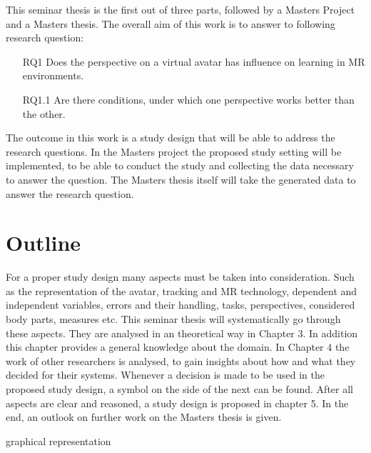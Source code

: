 This seminar thesis is the first out of three parts, followed by a Masters Project and a Masters thesis. The overall aim of this work is to answer to following research question:
\begin{itemize}
	\item[RQ1] Does the perspective on a virtual avatar has influence on learning in MR environments.
	\item[RQ1.1] Are there conditions, under which one perspective works better than the other.
\end{itemize}
The outcome in this work is a study design that will be able to address the research questions. In the Masters project the proposed study setting will be implemented, to be able to conduct the study and collecting the data necessary to answer the question. The Masters thesis itself will take the generated data to answer the research question.


\section{Outline}
For a proper study design many aspects must be taken into consideration. Such as the representation of the avatar, tracking and MR technology, dependent and independent variables, errors and their handling, tasks, perspectives, considered body parts, measures etc. This seminar thesis will systematically go through these aspects. They are analysed in an theoretical way in Chapter 3. In addition this chapter provides a general knowledge about the domain. In Chapter 4 the work of other researchers is analysed, to gain insights about how and what they decided for their systems. Whenever a decision is made to be used in the proposed study design, a symbol on the side of the next can be found\markme. After all aspects are clear and reasoned, a study design is proposed in chapter 5. In the end, an outlook on further work on the Masters thesis is given.

\todo graphical representation

